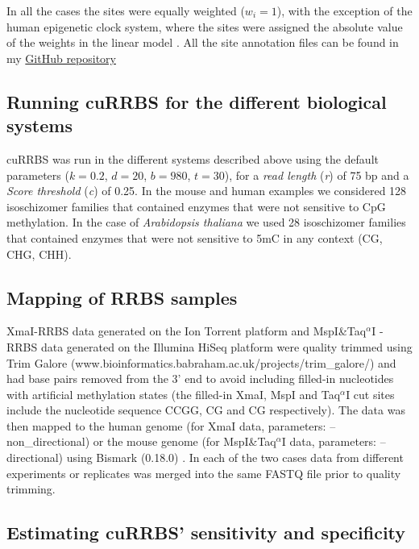 In all the cases the sites were equally weighted ($w_i = 1$), with the exception of the human epigenetic clock system, where the sites were assigned the absolute value of the weights in the linear model \cite{Horvath2013}. All the site annotation files can be found in my \href{https://github.com/demh/cuRRBS/tree/master/examples}{GitHub repository} \cite{Martin-Herranz2017}


\subsection*{Running cuRRBS for the different biological systems}

cuRRBS was run in the different systems described above using the default parameters ($k = 0.2$, $d = 20$, $b = 980$, $t = 30$), for a \textit{read length} (\textit{r}) of 75 bp and a \textit{Score threshold} (\textit{c}) of 0.25. In the mouse and human examples we considered 128 isoschizomer families that contained enzymes that were not sensitive to CpG methylation. In the case of \textit{Arabidopsis thaliana} we used 28 isoschizomer families that contained enzymes that were not sensitive to 5mC in any context (\acrshort{CG}, CHG, CHH).


\subsection*{Mapping of RRBS samples}

XmaI-RRBS data generated on the Ion Torrent platform \cite{Tanas2017} and MspI\&Taq$^\alpha$I -RRBS data generated on the Illumina HiSeq platform \cite{Lim2016} were quality trimmed using Trim Galore (www.bioinformatics.babraham.ac.uk/projects/trim\_galore/) and had base pairs removed from the 3' end to avoid including filled-in nucleotides with artificial methylation states (the filled-in XmaI, MspI and Taq$^\alpha$I cut sites include the nucleotide sequence CCGG, CG and CG respectively). The data was then mapped to the human genome (for XmaI data, parameters: --non\_directional) or the mouse genome (for MspI\&Taq$^\alpha$I  data, parameters: --directional) using Bismark (0.18.0) \cite{Krueger2011}. In each of the two cases data from different experiments or replicates was merged into the same FASTQ file prior to quality trimming.

\subsection*{Estimating cuRRBS' sensitivity and specificity }

